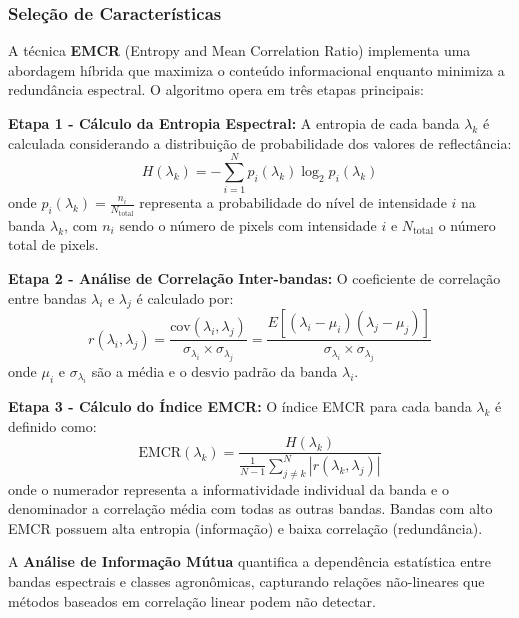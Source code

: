 \subsubsection{Seleção de Características}

A técnica \textbf{EMCR} (Entropy and Mean Correlation Ratio) implementa 
uma abordagem híbrida que maximiza o conteúdo informacional enquanto minimiza 
a redundância espectral. O algoritmo opera em três etapas principais:

\textbf{Etapa 1 - Cálculo da Entropia Espectral:} A entropia de cada banda 
$\lambda_k$ é calculada considerando a distribuição de probabilidade dos 
valores de reflectância:
\begin{equation}
H(\lambda_k) = -\sum_{i=1}^{N} p_i(\lambda_k) \log_2 p_i(\lambda_k)
\label{eq:entropy_spectral}
\end{equation}
onde $p_i(\lambda_k) = \frac{n_i}{N_{\text{total}}}$ representa a probabilidade do 
nível de intensidade $i$ na banda $\lambda_k$, com $n_i$ sendo o número de 
pixels com intensidade $i$ e $N_{\text{total}}$ o número total de pixels.

\textbf{Etapa 2 - Análise de Correlação Inter-bandas:} O coeficiente de 
correlação entre bandas $\lambda_i$ e $\lambda_j$ é calculado por:
\begin{equation}
r(\lambda_i,\lambda_j) = \frac{\text{cov}(\lambda_i,\lambda_j)}{\sigma_{\lambda_i} \times \sigma_{\lambda_j}} = \frac{E[(\lambda_i - \mu_i)(\lambda_j - \mu_j)]}{\sigma_{\lambda_i} \times \sigma_{\lambda_j}}
\label{eq:correlation_interbands}
\end{equation}
onde $\mu_i$ e $\sigma_{\lambda_i}$ são a média e o desvio padrão da banda $\lambda_i$.

\textbf{Etapa 3 - Cálculo do Índice EMCR:} O índice EMCR para cada banda 
$\lambda_k$ é definido como:
\begin{equation}
\text{EMCR}(\lambda_k) = \frac{H(\lambda_k)}{\frac{1}{N-1}\sum_{j \neq k}^{N} |r(\lambda_k,\lambda_j)|}
\label{eq:emcr_index}
\end{equation}
onde o numerador representa a informatividade individual da banda e o 
denominador a correlação média com todas as outras bandas. Bandas com 
alto EMCR possuem alta entropia (informação) e baixa correlação (redundância).

A \textbf{Análise de Informação Mútua} quantifica a dependência estatística 
entre bandas espectrais e classes agronômicas, capturando relações não-lineares 
que métodos baseados em correlação linear podem não detectar.

